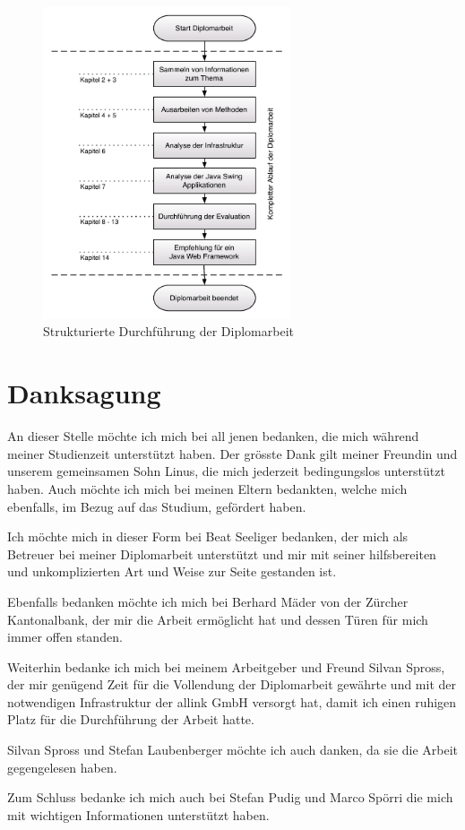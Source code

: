   \begin{figure}[htbp]
    \begin{center}
      \includegraphics[width=0.65\textwidth]{./image/durchfuehrungDerDiplomarbeit.pdf}
      \caption{Strukturierte Durchführung der Diplomarbeit}
      \label{img:durchfuehrungDerDiplomarbeit}
    \end{center}
  \end{figure}
  
  \clearpage
  
  \section{Danksagung}
  
  An dieser Stelle möchte ich mich bei all jenen bedanken, die mich während
  meiner Studienzeit unterstützt haben. Der grösste Dank gilt meiner Freundin und
  unserem gemeinsamen Sohn Linus, die mich jederzeit bedingungslos unterstützt
  haben. Auch möchte ich mich bei meinen Eltern bedankten, welche mich
  ebenfalls, im Bezug auf das Studium, gefördert haben.
  
  Ich möchte mich in dieser Form bei Beat Seeliger bedanken, der mich als
  Betreuer bei meiner Diplomarbeit unterstützt und mir mit seiner hilfsbereiten
  und unkomplizierten Art und Weise zur Seite gestanden ist.
  
  Ebenfalls bedanken möchte ich mich bei Berhard Mäder von der Zürcher
  Kantonalbank, der mir die Arbeit ermöglicht hat und dessen Türen für mich
  immer offen standen.
  
  Weiterhin bedanke ich mich bei meinem Arbeitgeber und Freund Silvan Spross,
  der mir genügend Zeit für die Vollendung der Diplomarbeit gewährte und mit der
  notwendigen Infrastruktur der allink GmbH versorgt hat, damit ich einen
  ruhigen Platz für die Durchführung der Arbeit hatte.
  
  Silvan Spross und Stefan Laubenberger möchte ich auch danken, da sie die
  Arbeit gegengelesen haben.
  
  Zum Schluss bedanke ich mich auch bei Stefan Pudig und Marco Spörri die
  mich mit wichtigen Informationen unterstützt haben.
    
